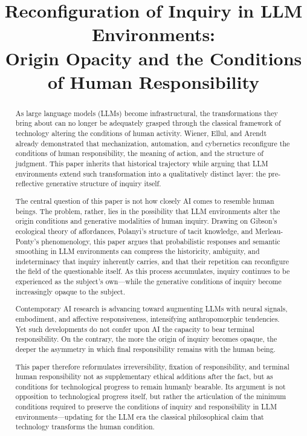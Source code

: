 \documentclass[12pt]{article}
\title{Reconfiguration of Inquiry in LLM Environments:\\
Origin Opacity and the Conditions of Human Responsibility}
\author{}
\date{}
\begin{document}
\maketitle

\begin{abstract}
As large language models (LLMs) become infrastructural, the transformations they bring about can no longer be adequately grasped through the classical framework of technology altering the conditions of human activity. Wiener, Ellul, and Arendt already demonstrated that mechanization, automation, and cybernetics reconfigure the conditions of human responsibility, the meaning of action, and the structure of judgment. This paper inherits that historical trajectory while arguing that LLM environments extend such transformation into a qualitatively distinct layer: the pre-reflective generative structure of inquiry itself.

The central question of this paper is not how closely AI comes to resemble human beings. The problem, rather, lies in the possibility that LLM environments alter the origin conditions and generative modalities of human inquiry. Drawing on Gibson's ecological theory of affordances, Polanyi's structure of tacit knowledge, and Merleau-Ponty's phenomenology, this paper argues that probabilistic responses and semantic smoothing in LLM environments can compress the historicity, ambiguity, and indeterminacy that inquiry inherently carries, and that their repetition can reconfigure the field of the questionable itself. As this process accumulates, inquiry continues to be experienced as the subject's own---while the generative conditions of inquiry become increasingly opaque to the subject.

Contemporary AI research is advancing toward augmenting LLMs with neural signals, embodiment, and affective responsiveness, intensifying anthropomorphic tendencies. Yet such developments do not confer upon AI the capacity to bear terminal responsibility. On the contrary, the more the origin of inquiry becomes opaque, the deeper the asymmetry in which final responsibility remains with the human being.

This paper therefore reformulates irreversibility, fixation of responsibility, and terminal human responsibility not as supplementary ethical additions after the fact, but as conditions for technological progress to remain humanly bearable. Its argument is not opposition to technological progress itself, but rather the articulation of the minimum conditions required to preserve the conditions of inquiry and responsibility in LLM environments---updating for the LLM era the classical philosophical claim that technology transforms the human condition.
\end{abstract}
\end{document}
